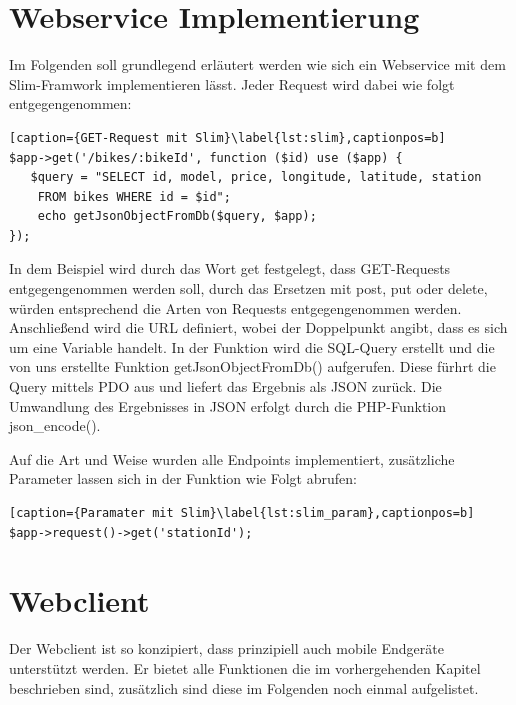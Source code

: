 \chapter{Webservice Implementierung}
Im Folgenden soll grundlegend erläutert werden wie sich ein Webservice mit dem Slim-Framwork implementieren lässt. Jeder Request wird dabei wie folgt entgegengenommen:
\begin{lstlisting}[caption={GET-Request mit Slim}\label{lst:slim},captionpos=b] 
$app->get('/bikes/:bikeId', function ($id) use ($app) {
   $query = "SELECT id, model, price, longitude, latitude, station 
	FROM bikes WHERE id = $id";
    echo getJsonObjectFromDb($query, $app); 
});
\end{lstlisting}
In dem Beispiel wird durch das Wort get festgelegt, dass GET-Requests entgegengenommen werden soll, durch das Ersetzen mit post, put oder delete, würden entsprechend die Arten von Requests entgegengenommen werden. Anschließend wird die URL definiert, wobei der Doppelpunkt angibt, dass es sich um eine Variable handelt. In der Funktion wird die SQL-Query erstellt und die von uns erstellte Funktion getJsonObjectFromDb() aufgerufen. Diese fürhrt die Query mittels PDO aus und liefert das Ergebnis als JSON zurück. Die Umwandlung des Ergebnisses in JSON erfolgt durch die PHP-Funktion json\_encode().

Auf die Art und Weise wurden alle Endpoints implementiert, zusätzliche Parameter lassen sich in der Funktion wie Folgt abrufen:
\begin{lstlisting}[caption={Paramater mit Slim}\label{lst:slim_param},captionpos=b] 
$app->request()->get('stationId');
\end{lstlisting}

\chapter{Webclient}

Der Webclient ist so konzipiert, dass prinzipiell auch mobile Endgeräte unterstützt werden.
Er bietet alle Funktionen die im vorhergehenden Kapitel beschrieben sind, zusätzlich sind diese im Folgenden noch einmal aufgelistet.

